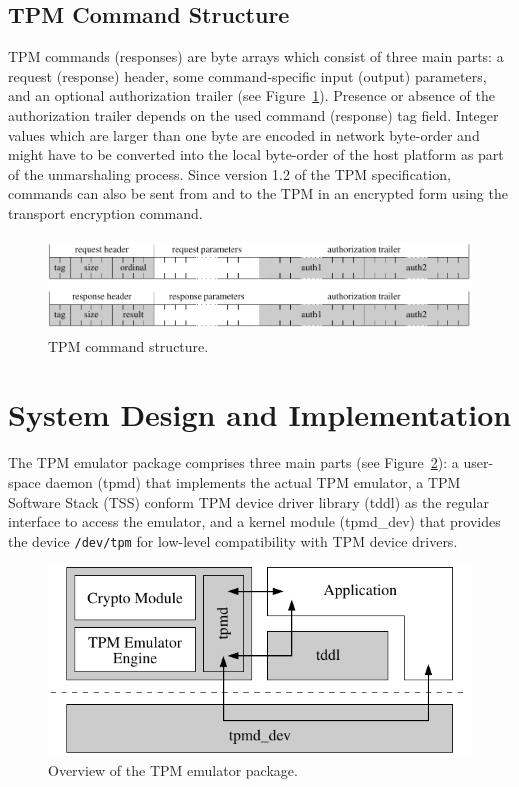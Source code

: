 \documentclass[runningheads]{llncs}
\newcommand{\file}[1]{\small\texttt{#1}\normalsize}
\begin{document}
\subsection{TPM Command Structure}
TPM commands (responses) are byte arrays which consist of three main parts:
a request (response) header, some command-specific input (output) parameters,
and an optional authorization trailer (see Figure~\ref{fig:tpm_command}).
Presence or absence of the authorization trailer depends on the used command
(response) tag field. Integer values which are larger than one byte are
encoded in network byte-order and might have to be converted into the local
byte-order of the host platform as part of the unmarshaling process. Since
version 1.2 of the TPM specification, commands can also be sent from and to
the TPM in an encrypted form using the transport encryption command.

\begin{figure}
	\begin{center}
		\includegraphics[height=25mm]{figures/tpm_command_structure}
		\caption{TPM command structure.}
		\label{fig:tpm_command}
	\end{center}
\end{figure}


\section{System Design and Implementation}\label{sec:design}
The TPM emulator package comprises three main parts (see Figure~\ref{fig:system_overview}):
a user-space daemon (tpmd) that implements the actual TPM emulator, a TPM Software Stack (TSS)
conform TPM device driver library (tddl) as the regular interface to access the emulator, and a
kernel module (tpmd\_dev) that provides the device \file{/dev/tpm} for low-level compatibility
with TPM device drivers.

\begin{figure}
	\begin{center}
		\includegraphics[width=.5\textwidth]{figures/system_overview}
		\caption{Overview of the TPM emulator package.}
		\label{fig:system_overview}
	\end{center}
\end{figure}
\end{document}
